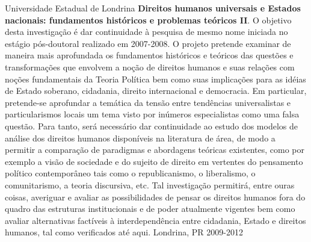 \begin{cvhonors}
  \cvhonor
    {Universidade Estadual de Londrina}
    {\textbf{Direitos humanos universais e Estados nacionais: fundamentos históricos e problemas teóricos II}. O objetivo desta investigação é dar continuidade à pesquisa de mesmo nome iniciada no estágio pós-doutoral realizado em 2007-2008. O projeto pretende examinar de maneira mais aprofundada os fundamentos históricos e teóricos das questões e transformações que envolvem a noção de direitos humanos e suas relações com noções fundamentais da Teoria Política bem como suas implicações para as idéias de Estado soberano, cidadania, direito internacional e democracia. Em particular, pretende-se aprofundar a temática da tensão entre tendências universalistas e particularismos locais um tema visto por inúmeros especialistas como uma falsa questão. Para tanto, será necessário dar continuidade ao estudo dos modelos de análise dos direitos humanos disponíveis na literatura de área, de modo a permitir a comparação de paradigmas e abordagens teóricas existentes, como por exemplo a visão de sociedade e do sujeito de direito em vertentes do pensamento político contemporâneo tais como o republicanismo, o liberalismo, o comunitarismo, a teoria discursiva, etc. Tal investigação permitirá, entre ouras coisas, averiguar e avaliar as possibilidades de pensar os direitos humanos fora do quadro das estruturas institucionais e de poder atualmente vigentes bem como avaliar alternativas factíveis à interdependência entre cidadania, Estado e direitos humanos, tal como verificados até aqui.}
    {Londrina, PR}
    {2009-2012}
\end{cvhonors}

